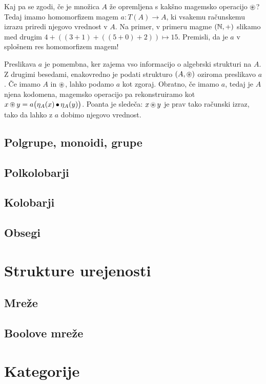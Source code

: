 Kaj pa se zgodi, če je množica $A$ že opremljena s kakšno magemsko operacijo $\mathop{\circledast}\nolimits$? Tedaj imamo homomorfizem magem $a\colon T(A) \to A$, ki vsakemu računskemu izrazu priredi njegovo vrednost v $A$. Na primer, v primeru magme $(\mathbb{N}, +)$ slikamo med drugim $4 + ((3 + 1) + ((5 + 0) + 2)) \mapsto 15$. Premisli, da je $a$ v splošnem res homomorfizem magem!

Preslikava $a$ je pomembna, ker zajema vso informacijo o algebrski strukturi na $A$. Z drugimi besedami, enakovredno je podati strukturo $(A, \mathop{\circledast}\nolimits)$ oziroma preslikavo $a$. Če imamo $A$ in $\mathop{\circledast}\nolimits$, lahko podamo $a$ kot zgoraj. Obratno, če imamo $a$, tedaj je $A$ njena kodomena, magemsko operacijo pa rekonstruiramo kot $x \mathop{\circledast}\nolimits y = a\big(\eta_A(x) \mathop{\bullet}\nolimits \eta_A(y)\big)$. Poanta je sledeča: $x \mathop{\circledast}\nolimits y$ je prav tako računski izraz, tako da lahko z $a$ dobimo njegovo vrednost.

\subsection{Polgrupe, monoidi, grupe}

\subsection{Polkolobarji}
\subsection{Kolobarji}
\subsection{Obsegi}
\section{Strukture urejenosti}
\subsection{Mreže}
\subsection{Boolove mreže}
\section{Kategorije}


